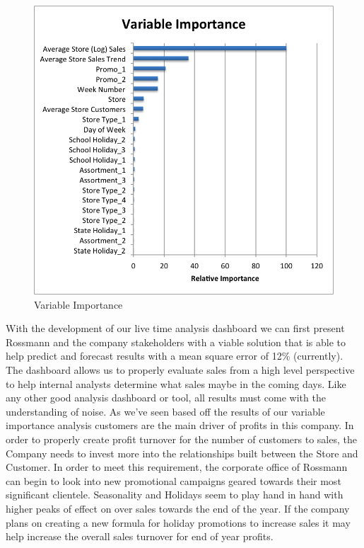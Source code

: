 \documentclass[DIV=calc, paper=a4, fontsize=11pt]{scrartcl}	 %
\begin{document}
\begin{figure}[!htbp]
\centering
\caption{Variable Importance}
\label{variables}
\includegraphics[width=\textwidth]{figures/VariableImportance.png}
\end{figure} 


With the development of our live time analysis dashboard we can first present 
Rossmann and the company stakeholders with a viable solution that is able to help predict and 
forecast results with a mean square error of 12\% (currently). The dashboard allows us to properly evaluate sales from a high level perspective to help internal analysts determine what sales maybe in the 
coming days. Like any other good analysis dashboard or tool, all results must come with the 
understanding of noise. As we’ve seen based off the results of our variable importance analysis 
customers are the main driver of profits in this company. In order to properly create profit 
turnover for the number of customers to sales, the Company needs to invest more into the 
relationships built between the Store and Customer. In order to meet this requirement, the 
corporate office of Rossmann can begin to look into new promotional campaigns geared 
towards their most significant clientele. Seasonality and Holidays seem to play hand in hand 
with higher peaks of effect on over sales towards the end of the year. If the company plans on 
creating a new formula for holiday promotions to increase sales it may help increase the overall 
sales turnover for end of year profits. 
\end{document}
